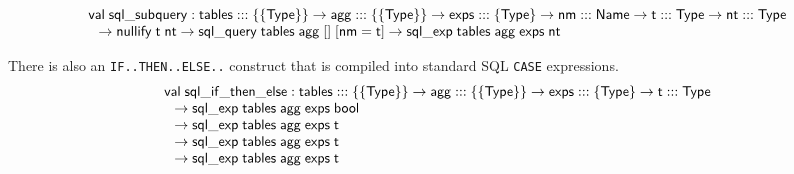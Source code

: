 \documentclass{article}
\newcommand{\cd}[1]{\texttt{#1}}
\newcommand{\mt}[1]{\mathsf{#1}}
\begin{document}
$$\begin{array}{l}
\mt{val} \; \mt{sql\_subquery} : \mt{tables} ::: \{\{\mt{Type}\}\} \to \mt{agg} ::: \{\{\mt{Type}\}\} \to \mt{exps} ::: \{\mt{Type}\} \to \mt{nm} ::: \mt{Name} \to \mt{t} ::: \mt{Type} \to \mt{nt} ::: \mt{Type} \\
\hspace{.1in} \to \mt{nullify} \; \mt{t} \; \mt{nt} \to \mt{sql\_query} \; \mt{tables} \; \mt{agg} \; [] \; [\mt{nm} = \mt{t}] \to \mt{sql\_exp} \; \mt{tables} \; \mt{agg} \; \mt{exps} \; \mt{nt}
\end{array}$$

There is also an \cd{IF..THEN..ELSE..} construct that is compiled into standard SQL \cd{CASE} expressions.
$$\begin{array}{l}
\mt{val} \; \mt{sql\_if\_then\_else} : \mt{tables} ::: \{\{\mt{Type}\}\} \to \mt{agg} ::: \{\{\mt{Type}\}\} \to \mt{exps} ::: \{\mt{Type}\} \to \mt{t} ::: \mt{Type} \\
\hspace{.1in} \to \mt{sql\_exp} \; \mt{tables} \; \mt{agg} \; \mt{exps} \; \mt{bool} \\
\hspace{.1in} \to \mt{sql\_exp} \; \mt{tables} \; \mt{agg} \; \mt{exps} \; \mt{t} \\
\hspace{.1in} \to \mt{sql\_exp} \; \mt{tables} \; \mt{agg} \; \mt{exps} \; \mt{t} \\
\hspace{.1in} \to \mt{sql\_exp} \; \mt{tables} \; \mt{agg} \; \mt{exps} \; \mt{t}
\end{array}$$
\end{document}
